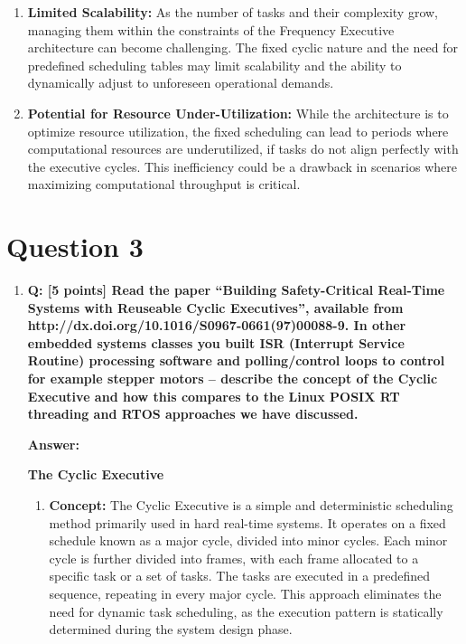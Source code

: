 \documentclass[a4paper,11pt]{article}%
\newenvironment{qanda}{\setlength{\parindent}{0pt}}{\bigskip}
\newcommand{\Q}{\bigskip\bfseries Q: }
\newcommand{\A}{\par\textbf{Answer: } \normalfont}
\begin{document}
\begin{qanda}
\begin{enumerate}
\begin{enumerate}
\begin{enumerate}
					      \item \textbf{Limited Scalability:} As the number of tasks and their complexity grow, managing them within the constraints of the Frequency Executive architecture can become challenging. The fixed cyclic nature and the need for predefined scheduling tables may limit scalability and the ability to dynamically adjust to unforeseen operational demands.

					      \item \textbf{Potential for Resource Under-Utilization:} While the architecture is to optimize resource utilization, the fixed scheduling can lead to periods where computational resources are underutilized, if tasks do not align perfectly with the executive cycles. This inefficiency could be a drawback in scenarios where maximizing computational throughput is critical.
				      \end{enumerate}

			\end{enumerate}


	\end{enumerate}




	\section{Question 3}
	\begin{enumerate}
		\item[] \Q  [5 points] Read the paper “Building Safety-Critical Real-Time Systems with Reuseable
			Cyclic Executives”, available from http://dx.doi.org/10.1016/S0967-0661(97)00088-9. In
			other embedded systems classes you built ISR (Interrupt Service Routine) processing
			software and polling/control loops to control for example stepper motors – describe the
			concept of the Cyclic Executive and how this compares to the Linux POSIX RT threading
			and RTOS approaches we have discussed.
			\A

			\textbf
			\textbf{The Cyclic Executive}
			\begin{enumerate}
				\item[] \textbf{Concept:} The Cyclic Executive is a simple and deterministic scheduling method primarily used in hard real-time systems. It operates on a fixed schedule known as a major cycle, divided into minor cycles. Each minor cycle is further divided into frames, with each frame allocated to a specific task or a set of tasks. The tasks are executed in a predefined sequence, repeating in every major cycle. This approach eliminates the need for dynamic task scheduling, as the execution pattern is statically determined during the system design phase.


\end{enumerate}
\end{enumerate}
\end{qanda}
\end{document}
